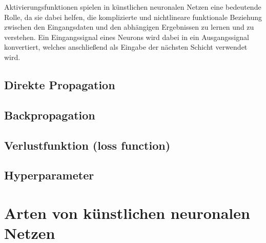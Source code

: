	Aktivierungsfunktionen spielen in künstlichen neuronalen Netzen eine bedeutende Rolle, da sie dabei helfen, die komplizierte und nichtlineare funktionale Beziehung zwischen den Eingangsdaten und den abhängigen Ergebnissen zu lernen und zu verstehen. Ein Eingangssignal eines Neurons wird dabei in ein Ausgangssignal konvertiert, welches anschließend als Eingabe der nächsten Schicht verwendet wird. \cite{ai-united}
	
\subsection{Direkte Propagation}

\subsection{Backpropagation}

\subsection{Verlustfunktion (loss function)}

\subsection{Hyperparameter}

\section{Arten von  künstlichen neuronalen Netzen}






